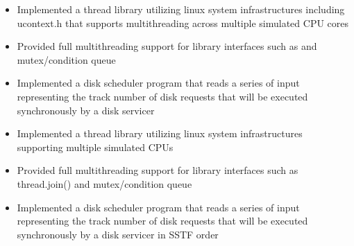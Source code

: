 \documentclass{resume}
\begin{document}
\begin{itemize}
	\item Implemented a thread library utilizing linux system infrastructures including ucontext.h that supports multithreading across multiple simulated CPU cores
	\item Provided full multithreading support for library interfaces such as and mutex/condition queue
	\item Implemented a disk scheduler program that reads a series of input representing the track number of disk requests that will be executed synchronously by a disk servicer
\end{itemize}

\begin{itemize}
\item Implemented a thread library utilizing linux system infrastructures supporting multiple simulated CPUs
\item Provided full multithreading support for library interfaces such as thread.join() and mutex/condition queue
\item Implemented a disk scheduler program that reads a series of input representing the track number of disk requests that will be executed synchronously by a disk servicer in SSTF order
\end{itemize}

%
%
\end{document}
